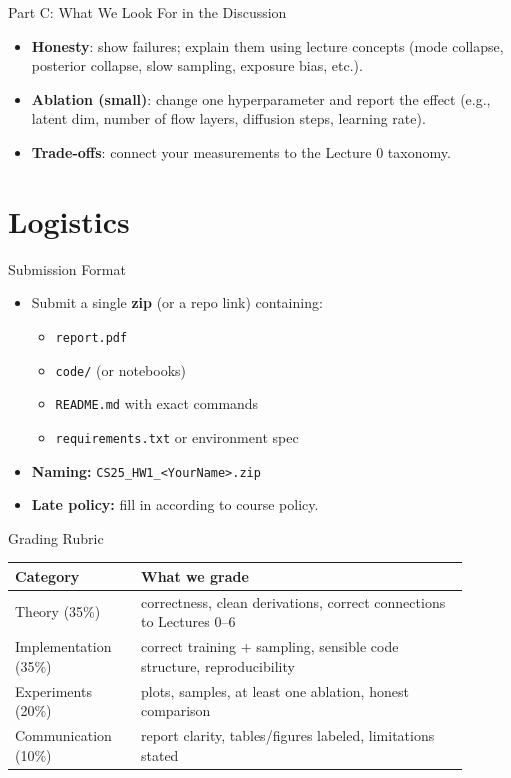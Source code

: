 \documentclass[aspectratio=169]{beamer}
\begin{document}
\begin{frame}{Part C: What We Look For in the Discussion}
\small
\begin{itemize}
  \item \textbf{Honesty}: show failures; explain them using lecture concepts (mode collapse, posterior collapse, slow sampling, exposure bias, etc.).
  \item \textbf{Ablation (small)}: change one hyperparameter and report the effect (e.g., latent dim, number of flow layers, diffusion steps, learning rate).
  \item \textbf{Trade-offs}: connect your measurements to the Lecture 0 taxonomy.
\end{itemize}
\end{frame}

\section{Logistics}

\begin{frame}{Submission Format}
\small
\begin{itemize}
  \item Submit a single \textbf{zip} (or a repo link) containing:
  \begin{itemize}
    \item \texttt{report.pdf}
    \item \texttt{code/} (or notebooks)
    \item \texttt{README.md} with exact commands
    \item \texttt{requirements.txt} or environment spec
  \end{itemize}
  \item \textbf{Naming:} \texttt{CS25\_HW1\_<YourName>.zip}
  \item \textbf{Late policy:} fill in according to course policy.
\end{itemize}
\end{frame}

\begin{frame}{Grading Rubric}
\small
\begin{tabular}{@{}p{0.25\linewidth}p{0.65\linewidth}@{}}
\toprule
\textbf{Category} & \textbf{What we grade} \\
\midrule
Theory (35\%) & correctness, clean derivations, correct connections to Lectures 0--6 \\
Implementation (35\%) & correct training + sampling, sensible code structure, reproducibility \\
Experiments (20\%) & plots, samples, at least one ablation, honest comparison \\
Communication (10\%) & report clarity, tables/figures labeled, limitations stated \\
\bottomrule
\end{tabular}
\end{frame}
\end{document}

